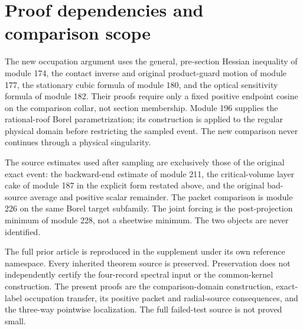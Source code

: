 \section{Proof dependencies and comparison scope}
\label{app:v96-dependencies}
The new occupation argument uses the general, pre-section Hessian
inequality of module 174, the contact inverse and original product-guard
motion of module 177, the stationary cubic formula of module 180, and
the optical sensitivity formula of module 182. Their proofs require
only a fixed positive endpoint cosine on the comparison collar, not
section membership. Module 196 supplies the rational-roof Borel
parametrization; its construction is applied to the regular physical
domain before restricting the sampled event. The new comparison never
continues through a physical singularity.

The source estimates used after sampling are exclusively those of the
original exact event: the backward-end estimate of module 211, the
critical-volume layer cake of module 187 in the explicit form restated
above, and the original bad-source average and positive scalar remainder.
The packet comparison is module 226 on the same Borel target subfamily.
The joint forcing is the post-projection minimum of module 228, not a
sheetwise minimum. The two objects are never identified.

The full prior article is reproduced in the supplement under its own
reference namespace. Every inherited theorem source is preserved.
Preservation does not independently certify the four-record spectral
input or the common-kernel construction. The present proofs are the
comparison-domain construction, exact-label occupation transfer, its
positive packet and radial-source consequences, and the three-way
pointwise localization. The full failed-test source is not proved small.
